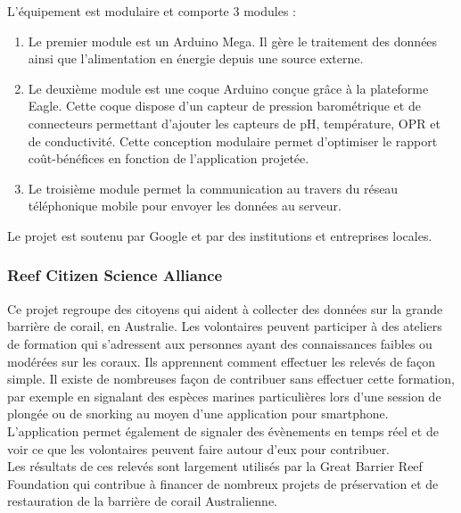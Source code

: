 \documentclass[10pt, article]{llncs}
\begin{document}
			L'équipement est modulaire et comporte 3 modules :\\
			\begin{enumerate}
				\item Le premier module est un Arduino Mega. Il gère le traitement des données ainsi que l'alimentation en énergie depuis une source externe.
				\item Le deuxième module est une coque Arduino conçue grâce à la plateforme Eagle. Cette coque dispose d'un capteur de pression barométrique et de connecteurs permettant d'ajouter les capteurs de pH, température, OPR et de conductivité. Cette conception modulaire permet d'optimiser le rapport coût-bénéfices en fonction de l'application projetée.
				\item Le troisième module permet la communication au travers du réseau téléphonique mobile pour envoyer les données au serveur.
			\end{enumerate}
			Le projet est soutenu par Google et par des institutions et entreprises locales.

		\subsubsection{Reef Citizen Science Alliance}
			Ce projet regroupe des citoyens qui aident à collecter des données sur la grande barrière de corail, en Australie. Les volontaires peuvent participer à des ateliers de formation qui s'adressent aux personnes ayant des connaissances faibles ou modérées sur les coraux. Ils apprennent comment effectuer les relevés de façon simple. Il existe de nombreuses façon de contribuer sans effectuer cette formation, par exemple en signalant des espèces marines particulières lors d'une session de plongée ou de snorking au moyen d'une application pour smartphone. L'application permet également de signaler des évènements en temps réel et de voir ce que les volontaires peuvent faire autour d'eux pour contribuer. \\
			Les résultats de ces relevés sont largement utilisés par la Great Barrier Reef Foundation qui contribue à financer de nombreux projets de préservation et de  restauration de la barrière de corail Australienne.
		
\end{document}
